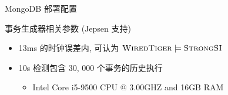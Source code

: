\begin{frame}{}
  
  \begin{center}
	MongoDB 部署配置
  \end{center}
\end{frame}

\begin{frame}{}
  
  \begin{center}
	事务生成器相关参数 (Jepsen 支持)
  \end{center}
\end{frame}

\begin{frame}{}

  \begin{itemize}
	\setlength{\itemsep}{10pt}
	\item 13ms 的时钟误差内, 可认为 $\textsc{WiredTiger} \models \textsc{StrongSI}$
	\item 10s 检测包含 30, 000 个事务的历史执行 \\[5pt]
	  \begin{itemize}
		\item Intel Core i5-9500 CPU @ 3.00GHZ and 16GB RAM
	  \end{itemize}
  \end{itemize}
\end{frame}
